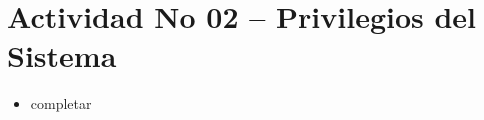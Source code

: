 \section{Actividad No 02 – Privilegios del Sistema}

\begin{itemize}
\item completar
\end{itemize} 

